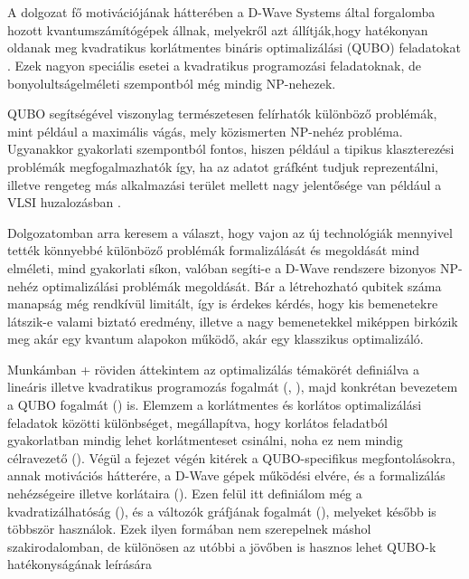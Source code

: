 
\chapter{\bevezetes}

A dolgozat fő motivációjának hátterében a D-Wave Systems által forgalomba hozott kvantumszámítógépek állnak, melyekről azt állítják,hogy hatékonyan oldanak meg kvadratikus korlátmentes bináris optimalizálási (QUBO) feladatokat \cite{DWaveSystem}. Ezek nagyon speciális esetei a kvadratikus programozási feladatoknak, de bonyolultságelméleti szempontból még mindig NP-nehezek.

QUBO segítségével viszonylag természetesen felírhatók különböző problémák, mint például a maximális vágás, mely közismerten NP-nehéz probléma. Ugyanakkor gyakorlati szempontból fontos, hiszen például a tipikus klaszterezési problémák megfogalmazhatók így, ha az adatot gráfként tudjuk reprezentálni, illetve rengeteg más alkalmazási terület mellett nagy jelentősége van például a VLSI huzalozásban \cite{wiki:VLSI}\cite{wiki:Maximum_cut}.

Dolgozatomban arra keresem a választ, hogy vajon az új technológiák mennyivel tették könnyebbé különböző problémák formalizálását és megoldását mind elméleti, mind gyakorlati síkon, valóban segíti-e a D-Wave rendszere bizonyos NP-nehéz optimalizálási problémák megoldását. Bár a létrehozható qubitek száma manapság még rendkívül limitált, így is érdekes kérdés, hogy kis bemenetekre látszik-e valami biztató eredmény, illetve a nagy bemenetekkel miképpen birkózik meg akár egy kvantum alapokon működő, akár egy klasszikus optimalizáló.

Munkámban \az+ röviden áttekintem az optimalizálás témakörét definiálva a lineáris illetve kvadratikus programozás fogalmát (, ), majd konkrétan bevezetem a QUBO fogalmát () is. Elemzem a korlátmentes és korlátos optimalizálási feladatok közötti különbséget, megállapítva, hogy korlátos feladatból gyakorlatban mindig lehet korlátmenteset csinálni, noha ez nem mindig célravezető ().
Végül a fejezet végén kitérek a QUBO-specifikus megfontolásokra, annak motivációs hátterére, a D-Wave gépek működési elvére, és a formalizálás nehézségeire illetve korlátaira (). Ezen felül itt definiálom még a kvadratizálhatóság (), és a változók gráfjának fogalmát (), melyeket később is többször használok. Ezek ilyen formában nem szerepelnek máshol szakirodalomban, de különösen az utóbbi a jövőben is hasznos lehet QUBO-k hatékonyságának leírására

